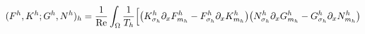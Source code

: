 \documentclass[preview]{standalone}
\newcommand{\dx}{\partial_x}
\begin{document}
\begin{align*}
\special{dvisvgm:raw <g id='unique000'>}(F^h,K^h;G^h,N^h)_h=\frac{1}{\mathrm{Re}}\int_\Omega\frac{1}{T_h}\Big[\big(K^h_{\sigma_h}\dx F^h_{m_h}-F^h_{\sigma_h}\dx K^h_{m_h}\big)\big(N^h_{\sigma_h}\dx G^h_{m_h}-G^h_{\sigma_h}\dx N^h_{m_h}\big)\special{dvisvgm:raw </g>}
\end{align*}
\end{document}
